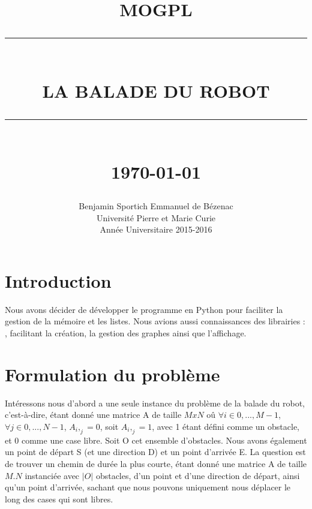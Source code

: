 \documentclass[12pt]{article}
\newcommand{\HRule}[1]{\rule{\linewidth}{#1}}
\begin{document}
\title{ \normalsize \textsc{MOGPL}
		\\ [2.0cm]
		\HRule{0.5pt} \\
		\LARGE \textbf{\uppercase{LA BALADE DU ROBOT}}
		\HRule{2pt} \\ [0.5cm]
		\normalsize \today \vspace*{5\baselineskip}}

\date{}

\author{
		Benjamin Sportich Emmanuel de Bézenac \\ 
		Université Pierre et Marie Curie \\
		Année Universitaire 2015-2016 }

\maketitle

\newpage
\tableofcontents

\newpage
\sectionfont{\scshape}

\clearpage
\newpage
\section{Introduction}
Nous avons décider de développer le programme en Python pour faciliter la gestion de la mémoire et les listes. Nous avions aussi connaissances des librairies : , facilitant la création, la gestion des graphes ainsi que l'affichage.


\clearpage
\newpage
\section{Formulation du problème}
Intéressons nous d'abord a une seule instance du problème de la balade du robot, c'est-à-dire, étant donné une matrice A de taille $MxN$ oû $\forall i \in {0,...,M-1}$, $\forall j \in {0,...,N-1}$, $A_i,_j=0$, soit $A_i,_j=1$, avec 1 étant défini comme un obstacle, et 0 comme une case libre. Soit O cet ensemble d'obstacles. Nous avons également un point de départ S (et une direction D) et un point d'arrivée E. La question est de trouver un chemin de durée la plus courte, étant donné une matrice A de taille $M.N$ instanciée avec $|O|$ obstacles, d'un point et d'une direction de départ, ainsi qu'un point d'arrivée, sachant que nous pouvons uniquement nous déplacer le long des cases qui sont libres.\\
\end{document}
